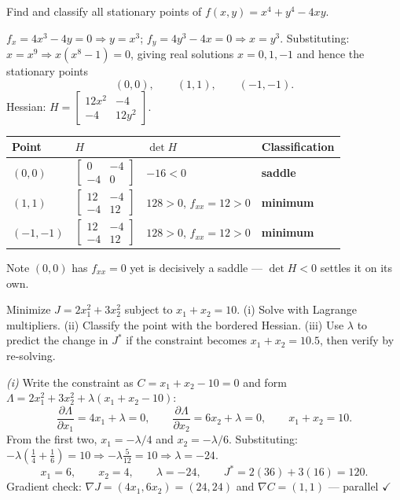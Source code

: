 \begin{probbox}
 Find and classify all stationary points of $f(x,y) = x^4+y^4-4xy$.

\ans $f_x = 4x^3-4y = 0 \Rightarrow y = x^3$; $f_y = 4y^3-4x = 0 \Rightarrow x = y^3$.
Substituting: $x = x^9 \Rightarrow x(x^8-1) = 0$, giving real solutions $x = 0, 1, -1$ and hence the stationary points
\[
(0,0), \qquad (1,1), \qquad (-1,-1).
\]
Hessian: $H = \begin{bmatrix}12x^2 & -4\\ -4 & 12y^2\end{bmatrix}$.
\begin{center}\small
\begin{tabular}{@{}llll@{}}
\toprule
Point & $H$ & $\det H$ & Classification\\
\midrule
$(0,0)$ & $\begin{bmatrix}0&-4\\-4&0\end{bmatrix}$ & $-16 < 0$ & \textbf{saddle}\\[6pt]
$(1,1)$ & $\begin{bmatrix}12&-4\\-4&12\end{bmatrix}$ & $128 > 0$, $f_{xx} = 12>0$ & \textbf{minimum}\\[6pt]
$(-1,-1)$ & $\begin{bmatrix}12&-4\\-4&12\end{bmatrix}$ & $128 > 0$, $f_{xx} = 12>0$ & \textbf{minimum}\\
\bottomrule
\end{tabular}
\end{center}
Note $(0,0)$ has $f_{xx} = 0$ yet is decisively a saddle --- $\det H<0$ settles it on its own.

 Minimize $J = 2x_1^2+3x_2^2$ subject to $x_1+x_2 = 10$. (i) Solve with Lagrange multipliers. (ii) Classify the point with the bordered Hessian. (iii) Use $\lambda$ to predict the change in $J^\ast$ if the constraint becomes $x_1+x_2 = 10.5$, then verify by re-solving.

\ans \emph{(i)} Write the constraint as $C = x_1+x_2-10 = 0$ and form $\Lambda = 2x_1^2+3x_2^2+\lambda(x_1+x_2-10)$:
\[
\frac{\partial\Lambda}{\partial x_1} = 4x_1+\lambda = 0, \qquad
\frac{\partial\Lambda}{\partial x_2} = 6x_2+\lambda = 0, \qquad
x_1+x_2 = 10 .
\]
From the first two, $x_1 = -\lambda/4$ and $x_2 = -\lambda/6$. Substituting:
$-\lambda\left(\frac14+\frac16\right) = 10 \Rightarrow -\lambda\frac{5}{12} = 10 \Rightarrow \lambda = -24$.
\[
x_1 = 6,\qquad x_2 = 4,\qquad \lambda = -24,\qquad J^\ast = 2(36)+3(16) = 120 .
\]
Gradient check: $\nabla J = (4x_1, 6x_2) = (24,24)$ and $\nabla C = (1,1)$ --- parallel $\checkmark$


\end{probbox}

